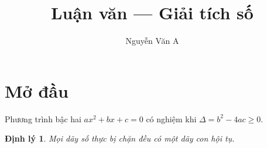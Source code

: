 \documentclass[11pt]{article}
\title{Luận văn — Giải tích số}
\author{Nguyễn Văn A}
\newtheorem{theorem}{Định lý}
\begin{document}
\maketitle
\section{Mở đầu}
Phương trình bậc hai $ax^2 + bx + c = 0$ có nghiệm khi $\Delta = b^2 - 4ac \ge 0$.
\begin{theorem}
Mọi dãy số thực bị chặn đều có một dãy con hội tụ.
\end{theorem}
\end{document}
